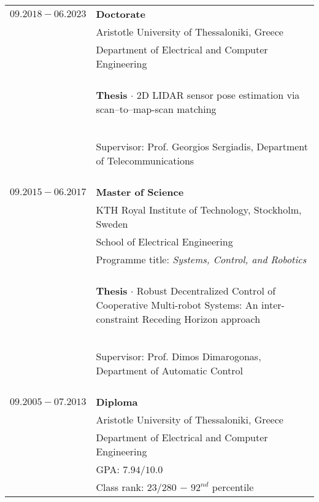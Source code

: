 \documentclass[a4paper,10pt,twoside]{article}
\begin{document}
\begin{tabular}{rp{11cm}}
$09.2018 - 06.2023$  & \textbf{Doctorate} \\
                     & Aristotle University of Thessaloniki, Greece \\
                     & Department of Electrical and Computer Engineering \\
                     & \\
                     & \begin{small}\textbf{Thesis} $\cdot$ 2D LIDAR sensor pose estimation via scan--to--map-scan matching \end{small} \\
                     & \begin{small}Supervisor: Prof. Georgios Sergiadis, Department of Telecommunications\end{small}\\
&\\
$09.2015 - 06.2017$  & \textbf{Master of Science} \\
                     & KTH Royal Institute of Technology, Stockholm, Sweden\\
                     & School of Electrical Engineering\\
                     & Programme title: \textit{Systems, Control, and Robotics} \\
                     & \\
                     & \begin{small}\textbf{Thesis} $\cdot$ Robust Decentralized Control of Cooperative Multi-robot Systems:
                       An inter-constraint Receding Horizon approach\end{small} \\
                     & \begin{small}Supervisor: Prof. Dimos Dimarogonas, Department of Automatic Control\end{small} \\
&\\
$09.2005 - 07.2013$  & \textbf{Diploma} \\
                     & Aristotle University of Thessaloniki, Greece \\
                     & Department of Electrical and Computer Engineering \\
                     & GPA: $7.94 / 10.0$ \\
                     & Class rank: $23 / 280$ $-$ $92^{nd}$ percentile \\

\end{tabular}
\end{document}
